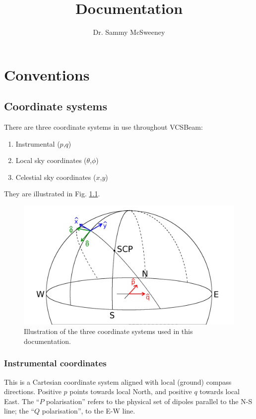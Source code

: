 \documentclass{book}
\title{\vcsbeam{} Documentation}
\author{Dr. Sammy McSweeney}
\newcommand{\vcsbeam}{{\sc VCSBeam}}
\begin{document}
\maketitle

\tableofcontents

\chapter{Conventions}

\section{Coordinate systems}

There are three coordinate systems in use throughout \vcsbeam{}:
\begin{enumerate}
    \item Instrumental ($p$,$q$)
    \item Local sky coordinates ($\theta$,$\phi$)
    \item Celestial sky coordinates ($x$,$y$)
\end{enumerate}
They are illustrated in Fig. \ref{fig:coords}.
\begin{figure}[!bh]
    \centering
    \includegraphics[width=\textwidth]{coords.png}
    \caption{Illustration of the three coordinate systems used in this documentation.}
    \label{fig:coords}
\end{figure}

\subsection{Instrumental coordinates}

This is a Cartesian coordinate system aligned with local (ground) compass directions.
Positive $p$ points towards local North, and positive $q$ towards local East.
The ``$P$ polarisation'' refers to the physical set of dipoles parallel to the N-S line; the ``$Q$ polarisation'', to the E-W line.
\end{document}
